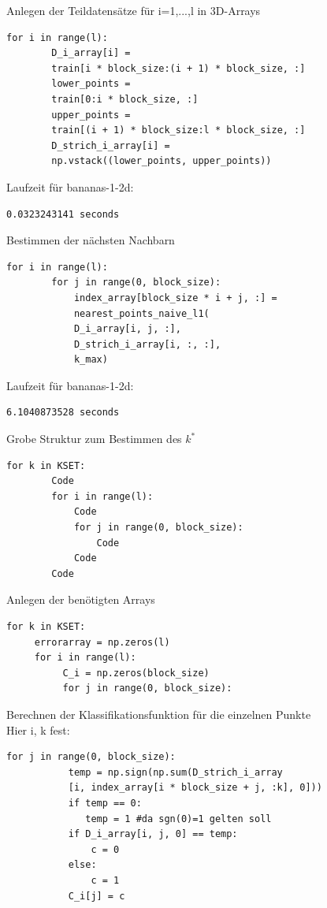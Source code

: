 \documentclass{beamer}
\begin{document}
\begin{frame}[fragile]
Anlegen der Teildatensätze für i=1,...,l in 3D-Arrays
\begin{verbatim}
for i in range(l):
        D_i_array[i] = 
        train[i * block_size:(i + 1) * block_size, :]
        lower_points = 
        train[0:i * block_size, :]
        upper_points = 
        train[(i + 1) * block_size:l * block_size, :]
        D_strich_i_array[i] =
        np.vstack((lower_points, upper_points))
\end{verbatim}
Laufzeit für bananas-1-2d:
\begin{verbatim}
0.0323243141 seconds
\end{verbatim}
\end{frame}

\begin{frame}[fragile]
Bestimmen der nächsten Nachbarn
\begin{verbatim}
for i in range(l):
        for j in range(0, block_size):
            index_array[block_size * i + j, :] =
            nearest_points_naive_l1(
            D_i_array[i, j, :],
            D_strich_i_array[i, :, :], 
            k_max)
\end{verbatim}
Laufzeit für bananas-1-2d:
\begin{verbatim}
6.1040873528 seconds
\end{verbatim}
\end{frame}

\begin{frame}[fragile]
Grobe Struktur zum Bestimmen des $k^*$
\begin{verbatim}
for k in KSET:
        Code
        for i in range(l):
            Code
            for j in range(0, block_size):
                Code
            Code
        Code
\end{verbatim}
\end{frame}

\begin{frame}[fragile]
Anlegen der benötigten Arrays
\begin{verbatim}
for k in KSET:
     errorarray = np.zeros(l)
     for i in range(l):
          C_i = np.zeros(block_size)
          for j in range(0, block_size):
\end{verbatim}
\end{frame}

\begin{frame}[fragile]
Berechnen der Klassifikationsfunktion für die einzelnen Punkte\\
Hier i, k fest:
\begin{verbatim}
for j in range(0, block_size):
           temp = np.sign(np.sum(D_strich_i_array
           [i, index_array[i * block_size + j, :k], 0]))
           if temp == 0:
              temp = 1 #da sgn(0)=1 gelten soll
           if D_i_array[i, j, 0] == temp:
               c = 0
           else:
               c = 1
           C_i[j] = c
\end{verbatim}
\end{frame}
\end{document}
